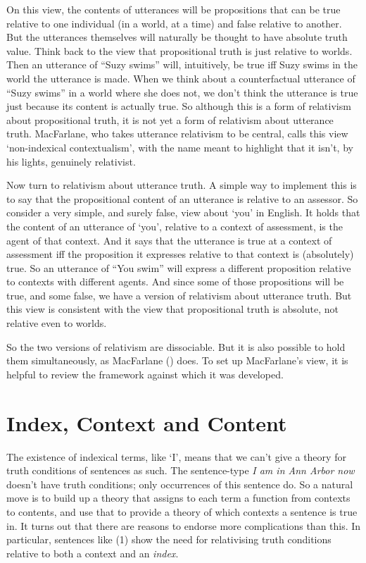 \documentclass[
  10pt,
  letterpaper,
  DIV=11,
  numbers=noendperiod,
  twoside]{scrartcl}
\begin{document}
On this view, the contents of utterances will be propositions that can
be true relative to one individual (in a world, at a time) and false
relative to another. But the utterances themselves will naturally be
thought to have absolute truth value. Think back to the view that
propositional truth is just relative to worlds. Then an utterance of
``Suzy swims'' will, intuitively, be true iff Suzy swims in the world
the utterance is made. When we think about a counterfactual utterance of
``Suzy swims'' in a world where she does not, we don't think the
utterance is true just because its content is actually true. So although
this is a form of relativism about propositional truth, it is not yet a
form of relativism about utterance truth. MacFarlane, who takes
utterance relativism to be central, calls this view `non-indexical
contextualism', with the name meant to highlight that it isn't, by his
lights, genuinely relativist.

Now turn to relativism about utterance truth. A simple way to implement
this is to say that the propositional content of an utterance is
relative to an assessor. So consider a very simple, and surely false,
view about `you' in English. It holds that the content of an utterance
of `you', relative to a context of assessment, is the agent of that
context. And it says that the utterance is true at a context of
assessment iff the proposition it expresses relative to that context is
(absolutely) true. So an utterance of ``You swim'' will express a
different proposition relative to contexts with different agents. And
since some of those propositions will be true, and some false, we have a
version of relativism about utterance truth. But this view is consistent
with the view that propositional truth is absolute, not relative even to
worlds.

So the two versions of relativism are dissociable. But it is also
possible to hold them simultaneously, as MacFarlane
() does. To set up MacFarlane's view,
it is helpful to review the framework against which it was developed.

\section{Index, Context and Content}\label{indexcontextandcontent}

The existence of indexical terms, like `I', means that we can't give a
theory for truth conditions of sentences as such. The sentence-type
\emph{I am in Ann Arbor now} doesn't have truth conditions; only
occurrences of this sentence do. So a natural move is to build up a
theory that assigns to each term a function from contexts to contents,
and use that to provide a theory of which contexts a sentence is true
in. It turns out that there are reasons to endorse more complications
than this. In particular, sentences like (1) show the need for
relativising truth conditions relative to both a context and an
\emph{index}.
\end{document}
